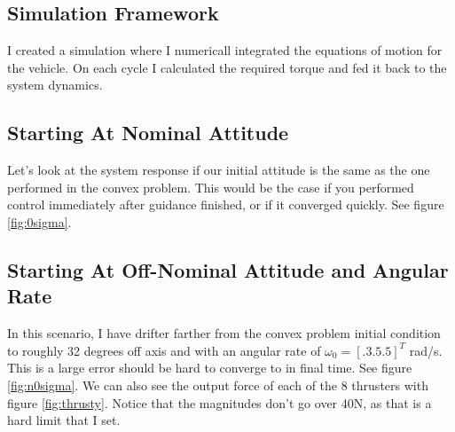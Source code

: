 \subsection{Simulation Framework}
I created a simulation where I numericall integrated the equations of motion for the vehicle. On each cycle I calculated the required torque and fed it back to the system dynamics.


\subsection{Starting At Nominal Attitude}
Let's look at the system response if our initial attitude is the same as the one performed in the convex problem. This would be the case if you performed control immediately after guidance finished, or if it converged quickly. See figure \ref{fig:0sigma}.


\subsection{Starting At Off-Nominal Attitude and Angular Rate}
In this scenario, I have drifter farther from the convex problem initial condition to roughly 32 degrees off axis and with an angular rate of $\omega_0 = \left[.3 .5 .5 \right]^T$ rad/s. This is a large error should be hard to converge to in final time. See figure \ref{fig:n0sigma}. We can also see the output force of each of the 8 thrusters with figure \ref{fig:thrusty}. Notice that the magnitudes don't go over 40N, as that is a hard limit that I set.





